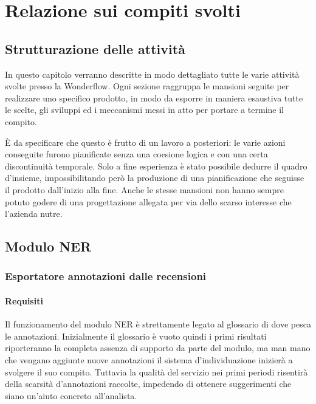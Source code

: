 
\chapter{Relazione sui compiti svolti}
\label{cap:relazione}

\section{Strutturazione delle attività}
In questo capitolo verranno descritte in modo dettagliato tutte le varie
attività svolte presso la Wonderflow. Ogni sezione raggruppa le mansioni seguite
per realizzare uno specifico prodotto, in modo da esporre in maniera esaustiva
tutte le scelte, gli sviluppi ed i meccanismi messi in atto per portare a
termine il compito.

È da specificare che questo è frutto di un lavoro a posteriori: le varie azioni
conseguite furono pianificate senza una coesione logica e con una certa
discontinuità temporale. Solo a fine esperienza è stato possibile dedurre il
quadro d'insieme, impossibilitando però la produzione di una pianificazione che
seguisse il prodotto dall'inizio alla fine. Anche le stesse mansioni non hanno
sempre potuto godere di una progettazione allegata per via dello scarso
interesse che l'azienda nutre.

\section{Modulo NER}
\label{sec:ner}
\subsection{Esportatore annotazioni dalle recensioni}
\subsubsection{Requisiti}
Il funzionamento del modulo NER è strettamente legato al glossario di dove
pesca le annotazioni. Inizialmente il glossario è vuoto quindi i primi risultati
riporteranno la completa assenza di supporto da parte del modulo, ma man mano
che vengano aggiunte nuove annotazioni il sistema d'individuazione inizierà a
svolgere il suo compito. Tuttavia la qualità del servizio nei primi periodi
risentirà della scarsità d'annotazioni raccolte, impedendo di ottenere
suggerimenti che siano un'aiuto concreto all'analista.

